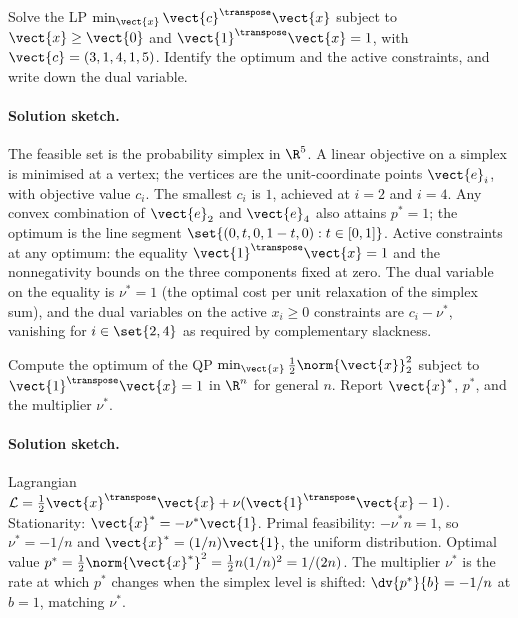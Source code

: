 \begin{exercise}
Solve the LP $\min_{\vect{x}} \vect{c}^{\transpose} \vect{x}$
subject to $\vect{x} \geq \vect{0}$ and $\vect{1}^{\transpose}
\vect{x} = 1$, with $\vect{c} = (3, 1, 4, 1, 5)$. Identify the
optimum and the active constraints, and write down the dual
variable.
\end{exercise}

\paragraph{Solution sketch.}
The feasible set is the probability simplex in $\R^{5}$. A linear
objective on a simplex is minimised at a vertex; the vertices are
the unit-coordinate points $\vect{e}_{i}$, with objective value
$c_{i}$. The smallest $c_{i}$ is $1$, achieved at $i = 2$ and $i =
4$. Any convex combination of $\vect{e}_{2}$ and $\vect{e}_{4}$
also attains $p^{*} = 1$; the optimum is the line segment
$\set{(0, t, 0, 1 - t, 0) : t \in [0, 1]}$. Active constraints at
any optimum: the equality $\vect{1}^{\transpose} \vect{x} = 1$ and
the nonnegativity bounds on the three components fixed at zero.
The dual variable on the equality is $\nu^{*} = 1$ (the optimal
cost per unit relaxation of the simplex sum), and the dual
variables on the active $x_{i} \geq 0$ constraints are $c_{i} -
\nu^{*}$, vanishing for $i \in \set{2, 4}$ as required by
complementary slackness.

\begin{exercise}
Compute the optimum of the QP $\min_{\vect{x}} \tfrac{1}{2}
\norm{\vect{x}}_{2}^{2}$ subject to $\vect{1}^{\transpose}
\vect{x} = 1$ in $\R^{n}$ for general $n$. Report
$\vect{x}^{*}$, $p^{*}$, and the multiplier $\nu^{*}$.
\end{exercise}

\paragraph{Solution sketch.}
Lagrangian $\mathcal{L} = \tfrac{1}{2} \vect{x}^{\transpose}
\vect{x} + \nu (\vect{1}^{\transpose} \vect{x} - 1)$. Stationarity:
$\vect{x}^{*} = -\nu^{*} \vect{1}$. Primal feasibility: $-\nu^{*}
n = 1$, so $\nu^{*} = -1/n$ and $\vect{x}^{*} = (1/n) \vect{1}$,
the uniform distribution. Optimal value $p^{*} = \tfrac{1}{2}
\norm{\vect{x}^{*}}^{2} = \tfrac{1}{2} n (1/n)^{2} = 1/(2n)$. The
multiplier $\nu^{*}$ is the rate at which $p^{*}$ changes when the
simplex level is shifted: $\dv{p^{*}}{b} = -1/n$ at $b = 1$,
matching $\nu^{*}$.

